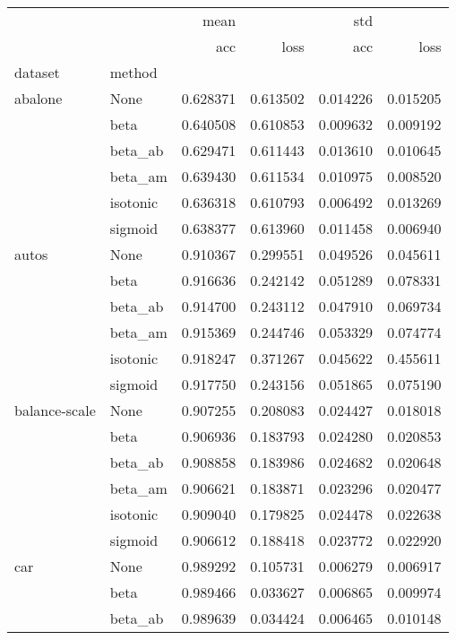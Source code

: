 \begin{tabular}{llrrrr}
\toprule
        &      &      mean &           &       std &           \\
        &      &       acc &      loss &       acc &      loss \\
dataset & method &           &           &           &           \\
\midrule
abalone & None &  0.628371 &  0.613502 &  0.014226 &  0.015205 \\
        & beta &  0.640508 &  0.610853 &  0.009632 &  0.009192 \\
        & beta\_ab &  0.629471 &  0.611443 &  0.013610 &  0.010645 \\
        & beta\_am &  0.639430 &  0.611534 &  0.010975 &  0.008520 \\
        & isotonic &  0.636318 &  0.610793 &  0.006492 &  0.013269 \\
        & sigmoid &  0.638377 &  0.613960 &  0.011458 &  0.006940 \\
autos & None &  0.910367 &  0.299551 &  0.049526 &  0.045611 \\
        & beta &  0.916636 &  0.242142 &  0.051289 &  0.078331 \\
        & beta\_ab &  0.914700 &  0.243112 &  0.047910 &  0.069734 \\
        & beta\_am &  0.915369 &  0.244746 &  0.053329 &  0.074774 \\
        & isotonic &  0.918247 &  0.371267 &  0.045622 &  0.455611 \\
        & sigmoid &  0.917750 &  0.243156 &  0.051865 &  0.075190 \\
balance-scale & None &  0.907255 &  0.208083 &  0.024427 &  0.018018 \\
        & beta &  0.906936 &  0.183793 &  0.024280 &  0.020853 \\
        & beta\_ab &  0.908858 &  0.183986 &  0.024682 &  0.020648 \\
        & beta\_am &  0.906621 &  0.183871 &  0.023296 &  0.020477 \\
        & isotonic &  0.909040 &  0.179825 &  0.024478 &  0.022638 \\
        & sigmoid &  0.906612 &  0.188418 &  0.023772 &  0.022920 \\
car & None &  0.989292 &  0.105731 &  0.006279 &  0.006917 \\
        & beta &  0.989466 &  0.033627 &  0.006865 &  0.009974 \\
        & beta\_ab &  0.989639 &  0.034424 &  0.006465 &  0.010148 \\

\end{tabular}
